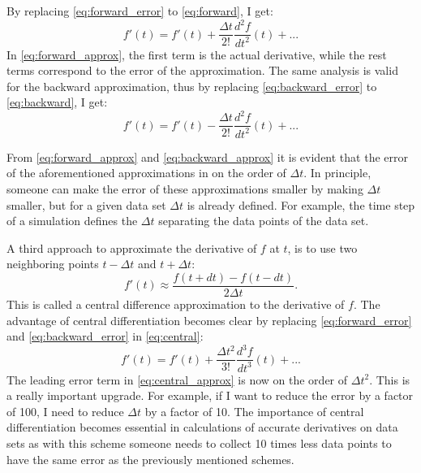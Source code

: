 By replacing \cref{eq:forward_error} to \cref{eq:forward}, I get:
\begin{equation}\label{eq:forward_approx}
    f'(t) = f'(t) + \frac{\Delta t}{2!} \frac{d^{2}f}{dt^{2}}(t) +...
\end{equation}
In \cref{eq:forward_approx}, the first term is the actual derivative, while the rest terms correspond to the error of the approximation. The same analysis is valid for the backward approximation, thus by replacing  \cref{eq:backward_error} to \cref{eq:backward}, I get:
\begin{equation}\label{eq:backward_approx}
    f'(t) = f'(t) - \frac{\Delta t}{2!} \frac{d^{2}f}{dt^{2}}(t) +...
\end{equation}

From \cref{eq:forward_approx} and \cref{eq:backward_approx} it is evident that the error of the aforementioned approximations in on the order of $\Delta t$. In principle, someone can make the error of these approximations smaller by making  $\Delta t$ smaller, but for a given data set $\Delta t$ is already defined. For example, the time step of a simulation defines the $\Delta t$ separating the data points of the data set.

A third approach to approximate the derivative of $f$ at $t$, is to use two neighboring points $t - \Delta t$ and $t + \Delta t$:
\begin{equation}\label{eq:central}
    f'(t) \approx \frac{f(t + dt) - f(t - dt)}{2\Delta t}.
\end{equation}
This is called a central difference approximation to the derivative of $f$. The advantage of central differentiation becomes clear by replacing \cref{eq:forward_error} and \cref{eq:backward_error} in \cref{eq:central}:
\begin{equation}\label{eq:central_approx}
    f'(t) = f'(t) + \frac{\Delta t^{2}}{3!} \frac{d^{3}f}{dt^{3}}(t) +...
\end{equation}
The leading error term in \cref{eq:central_approx} is now on the order of $\Delta t^{2}$. This is a really important upgrade. For example, if I want to reduce the error by a factor of 100, I need to reduce $\Delta t$ by a factor of 10. The importance of central differentiation becomes essential in calculations of accurate derivatives on data sets as with this scheme someone needs to collect 10 times less data points to have the same error as the previously mentioned schemes.







